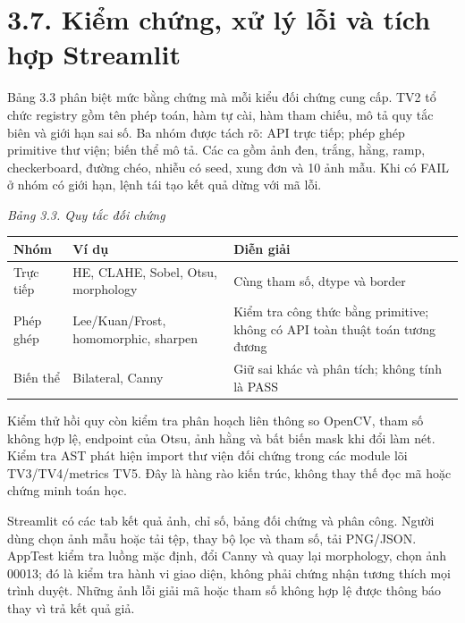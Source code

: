 \documentclass[12pt,a4paper]{extreport}
\begin{document}
\section*{3.7. Kiểm chứng,\allowbreak{} xử lý lỗi và tích hợp Streamlit}
Bảng 3.3 phân biệt mức bằng chứng mà mỗi kiểu đối chứng cung cấp. TV2 tổ chức registry gồm tên phép toán,\allowbreak{} hàm tự cài,\allowbreak{} hàm tham chiếu,\allowbreak{} mô tả quy tắc biên và giới hạn sai số. Ba nhóm được tách rõ: API trực tiếp; phép ghép primitive thư viện; biến thể mô tả. Các ca gồm ảnh đen,\allowbreak{} trắng,\allowbreak{} hằng,\allowbreak{} ramp,\allowbreak{} checkerboard,\allowbreak{} đường chéo,\allowbreak{} nhiễu có seed,\allowbreak{} xung đơn và 10 ảnh mẫu. Khi có FAIL ở nhóm có giới hạn,\allowbreak{} lệnh tái tạo kết quả dừng với mã lỗi.
\par
{\fontsize{10.5}{12}\selectfont\textit{Bảng 3.3. Quy tắc đối chứng}
\begin{longtable}{>{\raggedright\arraybackslash}p{5.035cm}|>{\raggedright\arraybackslash}p{5.035cm}|>{\raggedright\arraybackslash}p{5.035cm}}
\textbf{Nhóm} & \textbf{Ví dụ} & \textbf{Diễn giải}\\\hline
\endhead
Trực tiếp & HE,\allowbreak{} CLAHE,\allowbreak{} Sobel,\allowbreak{} Otsu,\allowbreak{} morphology & Cùng tham số,\allowbreak{} dtype và border\\\hline
Phép ghép & Lee/\allowbreak{}Kuan/\allowbreak{}Frost,\allowbreak{} homomorphic,\allowbreak{} sharpen & Kiểm tra công thức bằng primitive; không có API toàn thuật toán tương đương\\\hline
Biến thể & Bilateral,\allowbreak{} Canny & Giữ sai khác và phân tích; không tính là PASS\\\hline
\end{longtable}}
Kiểm thử hồi quy còn kiểm tra phân hoạch liên thông so OpenCV,\allowbreak{} tham số không hợp lệ,\allowbreak{} endpoint của Otsu,\allowbreak{} ảnh hằng và bất biến mask khi đổi làm nét. Kiểm tra AST phát hiện import thư viện đối chứng trong các module lõi TV3/\allowbreak{}TV4/\allowbreak{}metrics TV5. Đây là hàng rào kiến trúc,\allowbreak{} không thay thế đọc mã hoặc chứng minh toán học.
\par
Streamlit có các tab kết quả ảnh,\allowbreak{} chỉ số,\allowbreak{} bảng đối chứng và phân công. Người dùng chọn ảnh mẫu hoặc tải tệp,\allowbreak{} thay bộ lọc và tham số,\allowbreak{} tải PNG/\allowbreak{}JSON. AppTest kiểm tra luồng mặc định,\allowbreak{} đổi Canny và quay lại morphology,\allowbreak{} chọn ảnh 00013; đó là kiểm tra hành vi giao diện,\allowbreak{} không phải chứng nhận tương thích mọi trình duyệt. Những ảnh lỗi giải mã hoặc tham số không hợp lệ được thông báo thay vì trả kết quả giả.
\end{document}
